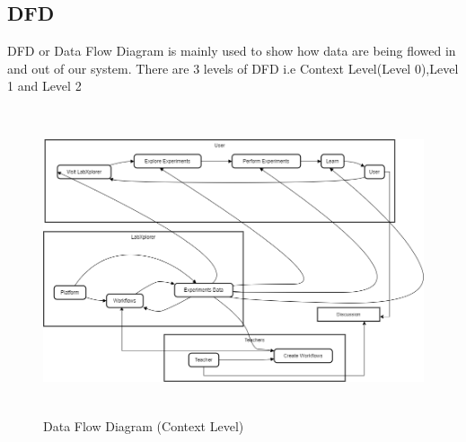 \subsection{DFD}
DFD or Data Flow Diagram is mainly used to show how data are being flowed in and out of our system. There are 3 levels of DFD i.e Context Level(Level 0),Level 1 and Level 2
\begin{figure}[H]
    \centering
    \includegraphics[height = 9cm]{Diagrams/DFD.drawio.png}
    \caption{Data Flow Diagram (Context Level)}
\end{figure}
\newpage

